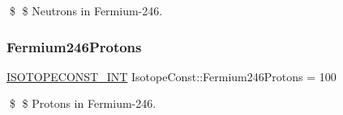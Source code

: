 \$ \$ Neutrons in Fermium-\/246. \mbox{\label{group___isotope_const-_fermium-_fm246_ga816e32ad23fcf279f650217ee8f920bb}} 
\subsubsection{\texorpdfstring{Fermium246\+Protons}{Fermium246Protons}}
{\footnotesize\ttfamily \mbox{\hyperlink{group___isotope_const-_macros_ga5f18360b3e99483a35c32d789e62621c}{I\+S\+O\+T\+O\+P\+E\+C\+O\+N\+S\+T\+\_\+\+I\+NT}} Isotope\+Const\+::\+Fermium246\+Protons = 100}

\$ \$ Protons in Fermium-\/246. 